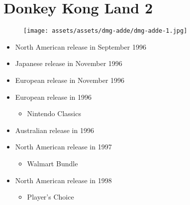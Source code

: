 \documentclass{book}
\begin{document}
\begingroup \chapter*{Donkey Kong Land 2} \endgroup
\begin{figure}[H]
\vskip 4pt
\centering
\texttt{[image: assets/assets/dmg-adde/dmg-adde-1.jpg]}\end{figure}
\begin{itemize} [nosep]




\item North American release in September 1996







\item Japanese release in November 1996







\item European release in November 1996







\item European release in 1996
\begin{itemize} [nosep]\item Nintendo Classics\end{itemize}\noindent






\item Australian release in 1996







\item North American release in 1997
\begin{itemize} [nosep]\item Walmart Bundle\end{itemize}\noindent






\item North American release in 1998
\begin{itemize} [nosep]\item Player’s Choice\end{itemize}\noindent







\end{itemize}
\end{document}
